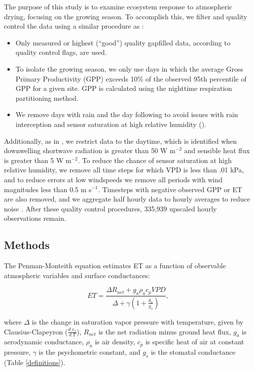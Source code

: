 \documentclass[draft,linenumbers]{agujournal}
\begin{document}
The purpose of this study is to examine ecosystem response to
atmospheric drying, focusing on the growing season. To accomplish
this, we filter and quality control the data using a similar procedure
as \cite{Zhou_2015}:
\begin{itemize}
\item Only measured or highest (``good'') quality gapfilled data,
according to quality control flags, are used.
\item To isolate the growing season, we only use days in which the
average Gross Primary Productivity (GPP) exceeds 10\% of the observed
95th percentile of GPP for a given site. GPP is calculated using the
nighttime respiration partitioning method.
\item We remove days with rain and the day following to avoid issues
with rain interception and sensor saturation at high relative humidity
(\cite{MEDLYN_2011}).
\end{itemize} Additionally, as in \citet{Lin_2018}, we restrict data
to the daytime, which is identified when downwelling shortwave
radiation is greater than 50 W m$^{-2}$ and sensible heat flux is
greater than 5 W m$^{-2}$. To reduce the chance of sensor saturation
at high relative humidity, we remove all time steps for which VPD is
less than .01 kPa, and to reduce errors at low windspeeds we remove
all periods with wind magnitudes less than 0.5 m s$^{-1}$. Timesteps
with negative observed GPP or ET are also removed, and we aggregate
half hourly data to hourly averages to reduce noise
\citep{Lin_2018}. After these quality control procedures, 335,939
upscaled hourly observations remain.

\subsection{Methods}
\label{methods} The Penman-Monteith equation \citep [hereafter
PM,][]{Penman_1948, Monteith_1965} estimates ET as a function of
observable atmospheric variables and surface conductances:
\begin{linenomath*}
  \begin{equation}
    \label{orig_pen} ET = \frac{\Delta R_{net} + g_a \rho_a c_p
VPD}{\Delta + \gamma(1 + \frac{g_a}{g_s})},
  \end{equation}
\end{linenomath*} where $\Delta$ is the change in saturation vapor
pressure with temperature, given by Clausius-Clapeyron ($\frac{d \;
e_s}{d \; T}$), $R_{net}$ is the net radiation minus ground heat flux,
$g_a$ is aerodynamic conductance, $\rho_a$ is air density, $c_p$ is
specific heat of air at constant pressure, $\gamma$ is the
psychometric constant, and $g_s$ is the stomatal conductance (Table
\ref{definitions}).
\end{document}
